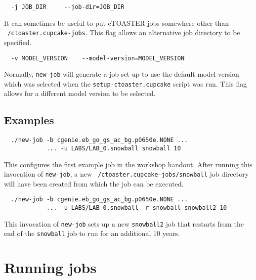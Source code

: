 \documentclass[a4paper,10pt,article]{memoir}
\begin{document}
\begin{verbatim}
  -j JOB_DIR     --job-dir=JOB_DIR
\end{verbatim}
It can sometimes be useful to put cTOASTER jobs somewhere other than
\texttt{~/ctoaster.cupcake-jobs}.  This flag allows an alternative job directory
to be specified.

\begin{verbatim}
  -v MODEL_VERSION    --model-version=MODEL_VERSION
\end{verbatim}
Normally, \texttt{new-job} will generate a job set up to use the
default model version which was selected when the
\texttt{setup-ctoaster.cupcake} script was run.  This flag allows for a
different model version to be selected.

\subsection*{Examples}

\begin{verbatim}
  ./new-job -b cgenie.eb_go_gs_ac_bg.p0650e.NONE ...
            ... -u LABS/LAB_0.snowball snowball 10
\end{verbatim}
This configures the first example job in the workshop handout.  After
running this invocation of \texttt{new-job}, a new
\texttt{~/ctoaster.cupcake-jobs/snowball} job directory will have been created
from which the job can be executed.

\begin{verbatim}
  ./new-job -b cgenie.eb_go_gs_ac_bg.p0650e.NONE ...
            ... -u LABS/LAB_0.snowball -r snowball snowball2 10
\end{verbatim}
This invocation of \texttt{new-job} sets up a new \texttt{snowball2}
job that restarts from the end of the \texttt{snowball} job to run for
an additional 10 years.

\section{Running jobs}
\end{document}

